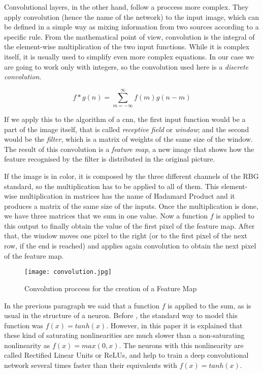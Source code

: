 Convolutional layers, in the other hand, follow a proccess more complex. They apply convolution (hence the name of the network) to the input image, which can be defined in a simple way as mixing information from two sources according to a specific rule. From the mathematical point of view, convolution is the integral of the element-wise multiplication of the two input functions. While it is complex itself, it is usually used to simplify even more complex equations. In our case we are going to work only with integers, so the convolution used here is a \textit{discrete convolution}. 

\begin{equation}
	\label{discrete_conv}
	f*g(n) = \sum_{m= -\infty}^{\infty} f(m) g(n-m) 
\end{equation}

If we apply this to the algorithm of a \gls{cnn}, the first input function would be a part of the image itself, that is called \textit{receptive field} or \textit{window}; and the second would be the \textit{filter}, which is a matrix of weights of the same size of the window. The result of this convolution is a \textit{feature map}, a new image that shows how the feature recognised by the filter is distributed in the original picture. 

If the image is in color, it is composed by the three different channels of the RBG standard, so the multiplication has to be applied to all of them. This element-wise multiplication in matrices has the name of Hadamard Product and it produces a matrix of the same size of the inputs. Once the multiplication is done, we have three matrices that we sum in one value. Now a function $f$ is applied to this output to finally obtain the value of the first pixel of the feature map. After that, the window moves one pixel to the right (or to the first pixel of the next row, if the end is reached) and applies again convolution to obtain the next pixel of the feature map. 

\begin{figure}[!ht]
	\centering
	\texttt{[image: convolution.jpg]}
	\caption{Convolution proccess for the creation of a Feature Map}
	\label{fig:convol_creation_feature_map}
\end{figure}

In the previous paragraph we said that a function $f$ is applied to the sum, as is usual in the structure of a neuron. Before \cite{krizhevsky2012deep}, the standard way to model this function was $f(x)=tanh(x)$. However, in this paper it is explained that these kind of saturating nonlinearities are much slower than a non-saturating nonlinearity as $f(x)=max(0, x)$. The neurons with this nonlinearity are called Rectified Linear Units or ReLUs, and help to train a deep convolutional network several times faster than their equivalents with $f(x)=tanh(x)$.

